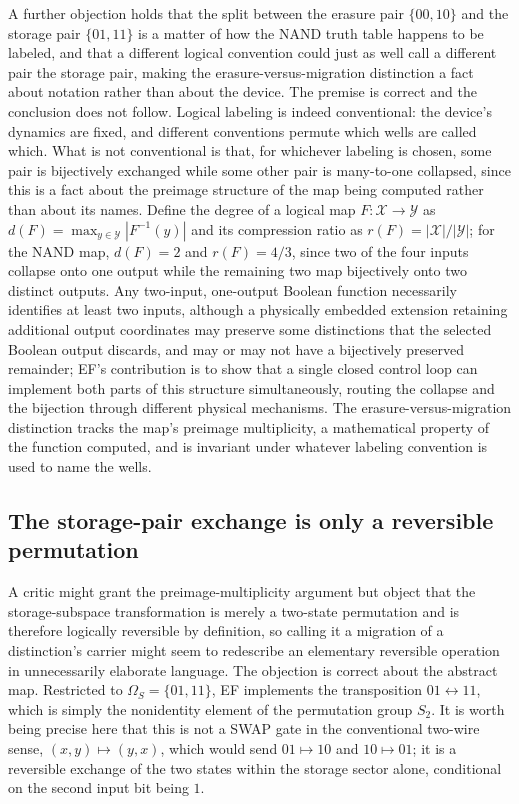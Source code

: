 \documentclass[11pt]{article}
\begin{document}
A further objection holds that the split between the erasure pair $\{00,10\}$ and the storage pair $\{01,11\}$ is a matter of how the NAND truth table happens to be labeled, and that a different logical convention could just as well call a different pair the storage pair, making the erasure-versus-migration distinction a fact about notation rather than about the device. The premise is correct and the conclusion does not follow. Logical labeling is indeed conventional: the device's dynamics are fixed, and different conventions permute which wells are called which. What is not conventional is that, for whichever labeling is chosen, some pair is bijectively exchanged while some other pair is many-to-one collapsed, since this is a fact about the preimage structure of the map being computed rather than about its names. Define the degree of a logical map $F:\mathcal X\to\mathcal Y$ as $d(F)=\max_{y\in\mathcal Y}|F^{-1}(y)|$ and its compression ratio as $r(F)=|\mathcal X|/|\mathcal Y|$; for the NAND map, $d(F)=2$ and $r(F)=4/3$, since two of the four inputs collapse onto one output while the remaining two map bijectively onto two distinct outputs. Any two-input, one-output Boolean function necessarily identifies at least two inputs, although a physically embedded extension retaining additional output coordinates may preserve some distinctions that the selected Boolean output discards, and may or may not have a bijectively preserved remainder; EF's contribution is to show that a single closed control loop can implement both parts of this structure simultaneously, routing the collapse and the bijection through different physical mechanisms. The erasure-versus-migration distinction tracks the map's preimage multiplicity, a mathematical property of the function computed, and is invariant under whatever labeling convention is used to name the wells.

\subsection{The storage-pair exchange is only a reversible permutation}

A critic might grant the preimage-multiplicity argument but object that the storage-subspace transformation is merely a two-state permutation and is therefore logically reversible by definition, so calling it a migration of a distinction's carrier might seem to redescribe an elementary reversible operation in unnecessarily elaborate language. The objection is correct about the abstract map. Restricted to $\Omega_S=\{01,11\}$, EF implements the transposition $01\leftrightarrow11$, which is simply the nonidentity element of the permutation group $S_2$. It is worth being precise here that this is not a SWAP gate in the conventional two-wire sense, $(x,y)\mapsto(y,x)$, which would send $01\mapsto10$ and $10\mapsto01$; it is a reversible exchange of the two states within the storage sector alone, conditional on the second input bit being $1$.
\end{document}
